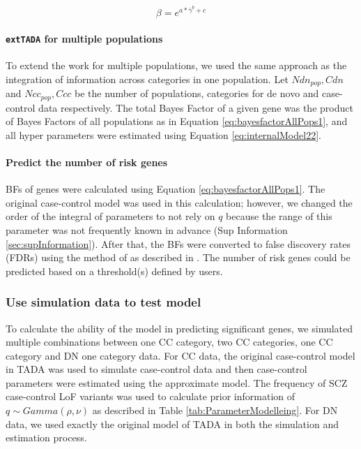 \documentclass[]{article}
\begin{document}
\begin{equation}
\label{eq:nonlinearBetaAndGamma}
\beta = e^{a*\bar{\gamma}^b + c}
\end{equation}



\paragraph{\texttt{extTADA} for multiple populations}

To extend the work for multiple populations,
we used the same approach as the integration of information across categories in one
population. Let $Ndn_{pop}, Cdn$ and $Ncc_{pop}, Ccc$ be the
number of populations, categories for de novo and case-control data respectively. The total Bayes Factor of a given gene was the product of
Bayes Factors of all populations as in Equation
\ref{eq:bayesfactorAllPops1}, and all hyper parameters were estimated
using Equation \ref{eq:internalModel22}.

\paragraph{Predict the number of risk genes}

BFs of genes were calculated using Equation
\ref{eq:bayesfactorAllPops1}. The original case-control model was used
in this calculation; however, we changed the order of the integral of
parameters to not rely on $q$ because the range of this parameter was
not frequently known in advance (Sup Information
\ref{sec:supInformation}). After that, the BFs were converted to false
discovery rates (FDRs) using the method of \cite{newton2004detecting} as described in \cite{de2014synaptic}. The
number of risk genes could be predicted based on a threshold(s)
defined by users.


\subsubsection{Use simulation data to test model}

To calculate the ability of the model in predicting significant genes,
we simulated multiple combinations between one CC category, two CC
categories, one CC category and DN one category data. For CC data,
the original case-control
model in TADA \citep{he2013integrated} was used to simulate
case-control data and then case-control parameters were estimated using
the approximate model. The frequency of SCZ case-control LoF variants was used to
calculate prior information of $q \sim Gamma(\rho, \nu)$ as described
in Table \ref{tab:ParameterModelleing}. For DN data, we used exactly the
original model of TADA in both the simulation and estimation
process.
\end{document}
